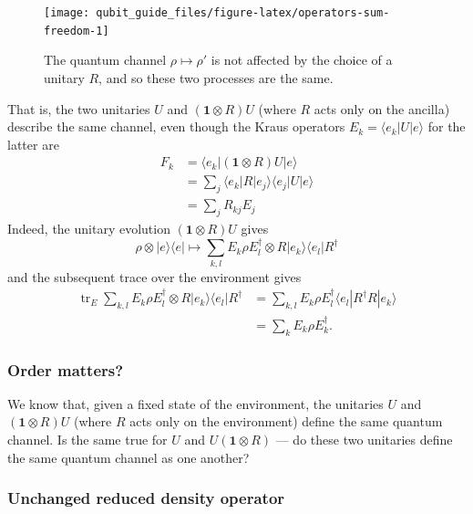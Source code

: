 \documentclass[fleqn,a4paper]{article}
\theoremstyle{definition}
\theoremstyle{definition}
\theoremstyle{definition}
\theoremstyle{definition}
\theoremstyle{remark}
\begin{document}
\begin{figure}[H]

{\centering \texttt{[image: qubit\_guide\_files/figure-latex/operators-sum-freedom-1]} 

}

\caption{The quantum channel \(\rho\mapsto\rho'\) is not affected by the choice of a unitary \(R\), and so these two processes are the same.}\label{fig:operators-sum-freedom}
\end{figure}

That is, the two unitaries \(U\) and \((\mathbf{1}\otimes R)U\) (where \(R\) acts only on the ancilla) describe the same channel, even though the Kraus operators \(E_k=\langle e_k|U|e\rangle\) for the latter are
\[
  \begin{aligned}
    F_k
    &= \langle e_k|(\mathbf{1}\otimes R)U|e\rangle
  \\&= \sum_j \langle e_k|R|e_j\rangle\langle e_j|U|e\rangle
  \\&= \sum_j R_{kj}E_j
  \end{aligned}
\]
Indeed, the unitary evolution \((\mathbf{1}\otimes R) U\) gives
\[
  \rho\otimes|e\rangle\langle e|
  \longmapsto
  \sum_{k,l} E_k \rho E_l^\dagger \otimes R|e_k\rangle\langle e_l| R^\dagger
\]
and the subsequent trace over the environment gives
\[
  \begin{aligned}
    \operatorname{tr}_E \sum_{k,l} E_k \rho E_l^\dagger \otimes R|e_k\rangle\langle e_l| R^\dagger
    &= \sum_{k,l} E_k \rho E_l^\dagger \langle e_l| R^\dagger R|e_k\rangle
  \\&= \sum_{k} E_k \rho E_k^\dagger.
  \end{aligned}
\]

\hypertarget{order-matters}{%
\subsubsection{Order matters?}\label{order-matters}}

We know that, given a fixed state of the environment, the unitaries \(U\) and \((\mathbf{1}\otimes R)U\) (where \(R\) acts only on the environment) define the same quantum channel.
Is the same true for \(U\) and \(U(\mathbf{1}\otimes R)\) --- do these two unitaries define the same quantum channel as one another?

\hypertarget{unchanged-reduced-density-operator}{%
\subsubsection{Unchanged reduced density operator}\label{unchanged-reduced-density-operator}}
\end{document}
